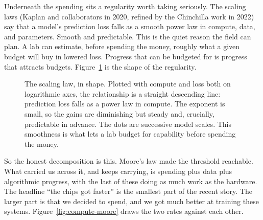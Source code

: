 Underneath the spending sits a regularity worth taking seriously. The scaling laws (Kaplan and collaborators in 2020, refined by the Chinchilla work in 2022) say that a model's prediction loss falls as a smooth power law in compute, data, and parameters. Smooth and predictable. This is the quiet reason the field can plan. A lab can estimate, before spending the money, roughly what a given budget will buy in lowered loss. Progress that can be budgeted for is progress that attracts budgets. Figure~\ref{fig:scaling-law} is the shape of the regularity.

\begin{figure}[h]
\centering
{}
\caption{The scaling law, in shape. Plotted with compute and loss both on logarithmic axes, the relationship is a straight descending line: prediction loss falls as a power law in compute. The exponent is small, so the gains are diminishing but steady and, crucially, predictable in advance. The dots are successive model scales. This smoothness is what lets a lab budget for capability before spending the money.}
\label{fig:scaling-law}
\end{figure}

So the honest decomposition is this. Moore's law made the threshold reachable. What carried us across it, and keeps carrying, is spending plus data plus algorithmic progress, with the last of these doing as much work as the hardware. The headline ``the chips got faster'' is the smallest part of the recent story. The larger part is that we decided to spend, and we got much better at training these systems. Figure~\ref{fig:compute-moore} draws the two rates against each other.

